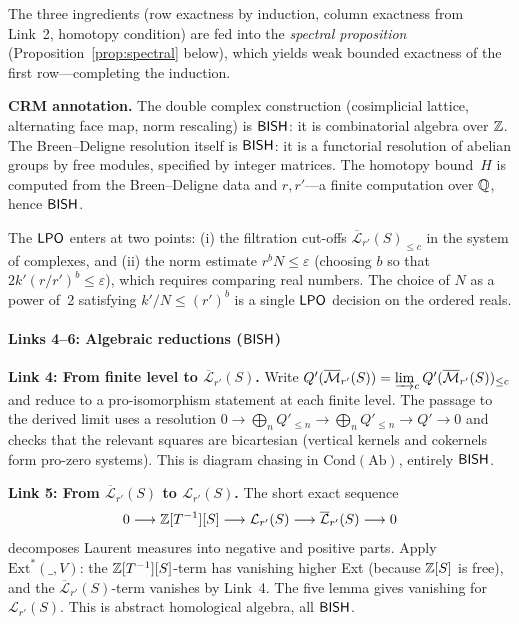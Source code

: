 \noindent The three ingredients (row exactness by induction, column
exactness from Link~2, homotopy condition) are fed into the
\emph{spectral proposition} (Proposition~\ref{prop:spectral} below),
which yields weak bounded exactness of the first row---completing
the induction.

\medskip
\noindent\textbf{CRM annotation.}
The double complex construction (cosimplicial lattice, alternating
face map, norm rescaling) is $\textsf{BISH}$: it is combinatorial algebra
over $\mathbb{Z}$.  The Breen--Deligne resolution itself is $\textsf{BISH}$: it is a
functorial resolution of abelian groups by free modules, specified by
integer matrices.  The homotopy bound~$H$ is computed from the
Breen--Deligne data and $r, r'$---a finite computation over $\mathbb{Q}$,
hence $\textsf{BISH}$.

The $\textsf{LPO}$ enters at two points: (i) the filtration cut-offs
$\overline{\mathcal{L}}_{r'}(S)_{\leq c}$ in the system of complexes,
and (ii) the norm estimate $r^b N \leq \varepsilon$ (choosing $b$
so that $2k'(r/r')^b \leq \varepsilon$), which requires comparing
real numbers.  The choice of $N$ as a power of~2 satisfying
$k'/N \leq (r')^b$ is a single $\textsf{LPO}$ decision on the ordered
reals.

\paragraph{Links 4--6: Algebraic reductions ($\textsf{BISH}$)}

\noindent\textbf{Link 4: From finite level to $\overline{\mathcal{L}}_{r'}(S)$.}
Write $Q'(\overline{\mathcal{M}}_{r'}(S)) = \varinjlim_c
Q'(\overline{\mathcal{M}}_{r'}(S))_{\leq c}$ and reduce to a
pro-isomorphism statement at each finite level.  The passage to the
derived limit uses a resolution
$0 \to \bigoplus_n Q'_{\leq n} \to \bigoplus_n Q'_{\leq n} \to
Q' \to 0$
and checks that the relevant squares are bicartesian (vertical kernels
and cokernels form pro-zero systems).  This is diagram chasing in
$\mathrm{Cond}(\mathrm{Ab})$, entirely $\textsf{BISH}$.

\medskip
\noindent\textbf{Link 5: From $\overline{\mathcal{L}}_{r'}(S)$
to $\mathcal{L}_{r'}(S)$.}
The short exact sequence
\[
  0 \longrightarrow \mathbb{Z}[T^{-1}][S] \longrightarrow
  \mathcal{L}_{r'}(S) \longrightarrow
  \overline{\mathcal{L}}_{r'}(S) \longrightarrow 0
\]
decomposes Laurent measures into negative and positive parts.
Apply $\mathrm{Ext}^*(\_, V)$: the $\mathbb{Z}[T^{-1}][S]$-term has
vanishing higher Ext (because $\mathbb{Z}[S]$ is free), and the
$\overline{\mathcal{L}}_{r'}(S)$-term vanishes by Link~4.
The five lemma gives vanishing for $\mathcal{L}_{r'}(S)$.
This is abstract homological algebra, all $\textsf{BISH}$.

